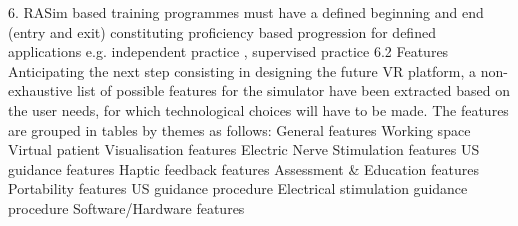 6. RASim based training programmes must have a defined beginning and end (entry and
exit) constituting proficiency based progression for defined applications e.g. independent
practice , supervised practice
6.2 Features
Anticipating the next step consisting in designing the future VR platform, a non-exhaustive
list of possible features for the simulator have been extracted based on the user needs, for
which technological choices will have to be made. The features are grouped in tables by
themes as follows:
General features
Working space
Virtual patient
Visualisation features
Electric Nerve Stimulation features
US guidance features
Haptic feedback features
Assessment \& Education features
Portability features
US guidance procedure
Electrical stimulation guidance procedure
Software/Hardware features


